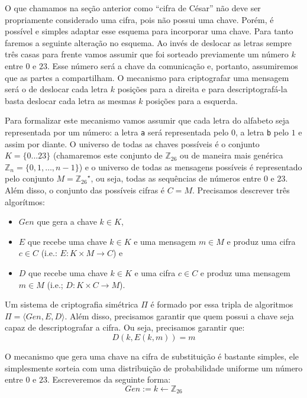 O que chamamos na seção anterior como ``cifra de César'' não deve ser propriamente considerado uma cifra, pois não possui uma chave.
Porém, é possível e simples adaptar esse esquema para incorporar uma chave.
Para tanto faremos a seguinte alteração no esquema.
Ao invés de deslocar as letras sempre três casas para frente vamos assumir que foi sorteado previamente um número $k$ entre $0$ e $23$.
Esse número será a chave da comunicação e, portanto, assumiremos que as partes a compartilham.
O mecanismo para criptografar uma mensagem será o de deslocar cada letra $k$ posições para a direita e para descriptografá-la basta deslocar cada letra as mesmas $k$ posições para a esquerda.

Para formalizar este mecanismo vamos assumir que cada letra do alfabeto seja representada por um número: a letra {\tt a} será representada pelo $0$, a letra {\tt b} pelo $1$ e assim por diante.
O universo de todas as chaves possíveis é o conjunto $K = \{0 ... 23\}$ (chamaremos este conjunto de $\mathbb{Z}_{26}$ ou de maneira mais genérica $\mathbb{Z}_n = \{0, 1, \dots, n - 1\}$) e o universo de todas as mensagens possíveis é representado pelo conjunto $M = {\mathbb{Z}_{26}}^\star$, ou seja, todas as sequências de números entre $0$ e $23$.
Além disso, o conjunto das possíveis cifras é $C = M$.
Precisamos descrever três algorítmos:
\begin{itemize}
\item $Gen$ que gera a chave $k \in K$,
\item $E$ que recebe uma chave $k \in K$ e uma mensagem $m \in M$ e produz uma cifra $c \in C$ (i.e.: $E: K \times M \to C$) e
\item $D$ que recebe uma chave $k \in K$ e uma cifra $c \in C$ e produz uma mensagem $m \in M$ (i.e.; $D: K \times C \to M$).
\end{itemize}

Um sistema de criptografia simétrica $\Pi$ é formado por essa tripla de algoritmos $\Pi = \langle Gen, E, D \rangle$.
Além disso, precisamos garantir que quem possui a chave seja capaz de descriptografar a cifra.
Ou seja, precisamos garantir que:
\begin{displaymath}
  D(k, E(k, m)) = m
\end{displaymath}

O mecanismo que gera uma chave na cifra de substituição é bastante simples, ele simplesmente sorteia com uma distribuição de probabilidade uniforme um número entre $0$ e $23$.
Escreveremos da seguinte forma:
\begin{displaymath}
Gen := k \leftarrow \mathbb{Z}_{26}  
\end{displaymath}

